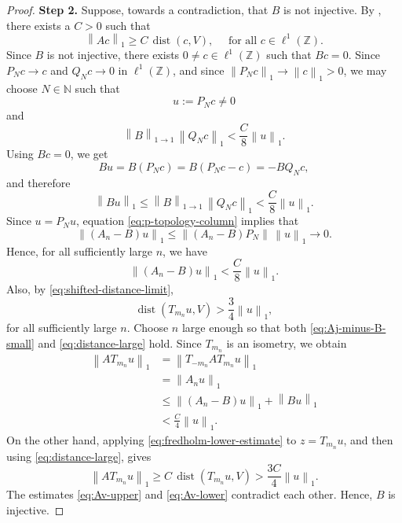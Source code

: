 \documentclass[reqno,a4paper,12pt]{amsart}
\numberwithin{equation}{section}
\def\N{{\mathbb N}}
\def\Z{{\mathbb Z}}
\newcommand\1{\mathds{1}}
\newcommand{\norm}[1]{\left\lVert #1 \right\rVert}
\newcommand{\dist}{\operatorname{dist}}
\begin{document}
\begin{proof}
\textbf{Step 2.} Suppose, towards a contradiction, that $B$ is not injective.
By \cite[Thm.~5.2, p.~231]{kato1980perturbation},  
there exists a $C>0$ such that
\begin{equation}\label{eq:fredholm-lower-estimate}
\norm{Ac}_1\ge C\,\dist(c,V),
\quad \text{ for all } c\in\ell^1(\Z).
\end{equation}
Since $B$ is not injective, there exists
$0\ne c\in\ell^1(\Z)$ such that $Bc=0$. Since $P_Nc\to c$ and
$Q_Nc\to0$ in $\ell^1(\Z)$, and since
$\norm{P_Nc}_1\to\norm{c}_1>0$, we may choose $N\in\N$ such that
$$
u:=P_Nc\ne0
$$
and
\begin{equation}\label{eq:tail-choice}
\norm{B}_{1\to1}\,\norm{Q_Nc}_1
<
\frac C8\norm{u}_1.
\end{equation}
Using $Bc=0$, we get
$$
Bu=B(P_Nc)=B(P_Nc-c)=-BQ_Nc,
$$
and therefore
\begin{equation}\label{eq:Bu-small}
\norm{Bu}_1
\le
\norm{B}_{1\to1}\,\norm{Q_Nc}_1
<
\frac C8\norm{u}_1.
\end{equation}
Since $u=P_Nu$, equation \eqref{eq:p-topology-column} implies that
$$
\norm{(A_n-B)u}_1
\le
\norm{(A_n-B)P_N}\,\norm{u}_1
\to 0.
$$
Hence, for all sufficiently large $n$, we have
\begin{equation}\label{eq:Aj-minus-B-small}
\norm{(A_n-B)u}_1
<
\frac C8\norm{u}_1.
\end{equation}
Also, by \eqref{eq:shifted-distance-limit},
\begin{equation}\label{eq:distance-large}
\dist(T_{m_n}u,V)
>
\frac34\norm{u}_1,
\end{equation}
for all sufficiently large $n$. Choose $n$ large enough so  that both \eqref{eq:Aj-minus-B-small} and
\eqref{eq:distance-large} hold.
Since 
$T_{m_n}$ is an isometry, we obtain
\begin{equation}\label{eq:Av-upper}
\begin{aligned}
\norm{AT_{m_n}u}_1
&=
\norm{T_{-m_n}AT_{m_n}u}_1 \\
&=
\norm{A_nu}_1 \\
&\le
\norm{(A_n-B)u}_1+\norm{Bu}_1 \\
&<
\frac C4\norm{u}_1.
\end{aligned}
\end{equation}
On the other hand, applying \eqref{eq:fredholm-lower-estimate} to
$z=T_{m_n}u$, and then using \eqref{eq:distance-large}, gives
\begin{equation}\label{eq:Av-lower}
\norm{AT_{m_n}u}_1
\ge
C\,\dist(T_{m_n}u,V)
>
\frac{3C}{4}\norm{u}_1.
\end{equation}
The estimates \eqref{eq:Av-upper} and \eqref{eq:Av-lower} contradict each
other. Hence, $B$ is injective.
\end{proof}
\end{document}
